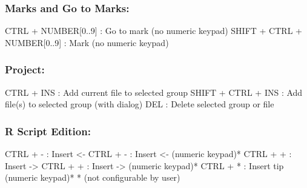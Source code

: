 \subsubsection{Marks and Go to Marks:}

\vspace{-0.5cm}
\begin{Rtables}[caption={[Marks and go to marks keyboard shortcuts]
    Marks and go to marks keyboard shortcuts},
  label=hotkey:marks]
  CTRL  + NUMBER[0..9]        : Go to mark (no numeric keypad)
  SHIFT + CTRL + NUMBER[0..9] : Mark (no numeric keypad)
\end{Rtables}


\subsubsection{Project:}

\vspace{-0.5cm}
\begin{Rtables}[caption={[Project keyboard shortcuts]
    Project keyboard shortcuts},
  label=hotkey:project]
  CTRL  + INS             : Add current file to selected group
  SHIFT + CTRL + INS      : Add file(s) to selected group (with dialog)
  DEL                     : Delete selected group or file
\end{Rtables}


\subsubsection{R Script Edition:}

\vspace{-0.5cm}
\begin{Rtables}[caption={[R script edition keyboard shortcuts]
    R script edition keyboard shortcuts},
  label=hotkey:rscript]
  CTRL + -                : Insert <-
  CTRL + -                : Insert <-  (numeric keypad)*
  CTRL + +                : Insert ->
  CTRL + +                : Insert ->  (numeric keypad)*
  CTRL + *                : Insert tip (numeric keypad)*
  * (not configurable by user)
\end{Rtables}


